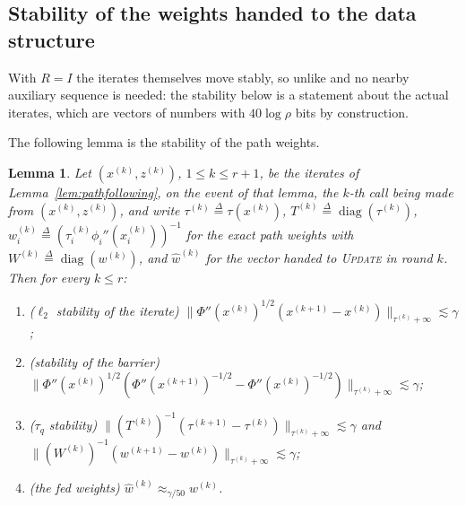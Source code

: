 \documentclass[11pt]{article}
\newtheorem{lemma}{Lemma}[section]
\newcommand{\diag}{\operatorname{diag}}
\newcommand{\what}{\widehat{w}}
\newcommand{\defeq}{\stackrel{\Delta}{=}}
\begin{document}
\subsection{Stability of the weights handed to the data structure}

With $R = I$ the iterates themselves move stably, so unlike \cite[Section
4.4]{LPTWY25:arxiv} and \cite[Lemmas 4.44 and
4.45]{BLLSSSW21} no nearby auxiliary sequence
is needed: the stability below is a statement about the actual iterates, which
are vectors of numbers with $40 \log \rho$ bits by construction.

The following lemma is the stability of the path weights.

\begin{lemma}
\label{lem:stability}
Let $(x^{(k)}, z^{(k)})$,
$1 \le k \le r + 1$, be the iterates of Lemma~\ref{lem:pathfollowing}, on the
event of that lemma, the $k$-th call being made from
$(x^{(k)}, z^{(k)})$, and write
$\tau^{(k)} \defeq \tau(x^{(k)})$,
$T^{(k)} \defeq \diag(\tau^{(k)})$,
$w^{(k)}_i \defeq (\tau^{(k)}_i \phi_i''(x^{(k)}_i))^{-1}$ for the exact path
weights with $W^{(k)} \defeq \diag(w^{(k)})$, and
$\what^{(k)}$ for the vector handed to \textsc{Update} in round
$k$.
Then for every $k \le r$:
\begin{enumerate}
\item \label{itm:stability:1} ($\ell_2$ stability of the iterate)
  $\| \Phi''(x^{(k)})^{1/2} (x^{(k + 1)} - x^{(k)}) \|_{\tau^{(k)} + \infty} \lesssim \gamma$;
\item \label{itm:stability:2} (stability of the barrier)
  $\| \Phi''(x^{(k)})^{1/2} ( \Phi''(x^{(k + 1)})^{-1/2} - \Phi''(x^{(k)})^{-1/2} ) \|_{\tau^{(k)} + \infty} \lesssim \gamma$;
\item \label{itm:stability:3} ($\tau_q$ stability)
  $\| (T^{(k)})^{-1} ( \tau^{(k + 1)} - \tau^{(k)} ) \|_{\tau^{(k)} + \infty} \lesssim \gamma$
  and
  $\| (W^{(k)})^{-1} ( w^{(k + 1)} - w^{(k)} ) \|_{\tau^{(k)} + \infty} \lesssim \gamma$;
\item \label{itm:stability:4} (the fed weights)
  $\what^{(k)} \approx_{\gamma / 50} w^{(k)}$.
\end{enumerate}
\end{lemma}
\end{document}
